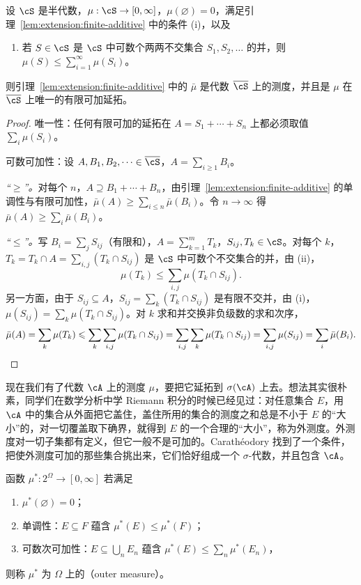 \begin{theorem}[从半代数到代数]\label{thm:extension:semialgebra}
设 $\cS$ 是半代数，$\mu:\cS\to[0,\infty]$，$\mu(\varnothing)=0$，满足引理~\ref{lem:extension:finite-additive} 中的条件 (i)，以及
\begin{enumerate}
\item[(ii)] 若 $S\in\cS$ 是 $\cS$ 中可数个两两不交集合 $S_1,S_2,\dots$ 的并，则 $\mu(S)\leqslant\sum_{i=1}^\infty\mu(S_i)$。
\end{enumerate}
则引理~\ref{lem:extension:finite-additive} 中的 $\bar\mu$ 是代数 $\overline\cS$ 上的测度，并且是 $\mu$ 在 $\overline\cS$ 上唯一的有限可加延拓。
\end{theorem}
\begin{proof}
唯一性：任何有限可加的延拓在 $A=S_1+\cdots+S_n$ 上都必须取值 $\sum_i\mu(S_i)$。

可数可加性：设 $A,B_1,B_2,\dots\in\overline\cS$，$A=\sum_{i\geqslant1}B_i$。

\emph{“$\geqslant$”。}对每个 $n$，$A\supseteq B_1+\cdots+B_n$，由引理~\ref{lem:extension:finite-additive} 的单调性与有限可加性，$\bar\mu(A)\geqslant\sum_{i\leqslant n}\bar\mu(B_i)$。令 $n\to\infty$ 得 $\bar\mu(A)\geqslant\sum_i\bar\mu(B_i)$。

\emph{“$\leqslant$”。}写 $B_i=\sum_jS_{ij}$（有限和），$A=\sum_{k=1}^mT_k$，$S_{ij},T_k\in\cS$。对每个 $k$，$T_k=T_k\cap A=\sum_{i,j}(T_k\cap S_{ij})$ 是 $\cS$ 中可数个不交集合的并，由 (ii)，
\[
\mu(T_k)\leqslant\sum_{i,j}\mu(T_k\cap S_{ij}).
\]
另一方面，由于 $S_{ij}\subseteq A$，$S_{ij}=\sum_k(T_k\cap S_{ij})$ 是有限不交并，由 (i)，$\mu(S_{ij})=\sum_k\mu(T_k\cap S_{ij})$。对 $k$ 求和并交换非负级数的求和次序，
\[
\bar\mu(A)=\sum_k\mu(T_k)\leqslant\sum_k\sum_{i,j}\mu(T_k\cap S_{ij})=\sum_{i,j}\sum_k\mu(T_k\cap S_{ij})=\sum_{i,j}\mu(S_{ij})=\sum_i\bar\mu(B_i).\qedhere
\]
\end{proof}


现在我们有了代数 $\cA$ 上的测度 $\mu$，要把它延拓到 $\sigma(\cA)$ 上去。想法其实很朴素，同学们在数学分析中学 Riemann 积分的时候已经见过：对任意集合 $E$，用 $\cA$ 中的集合从外面把它盖住，盖住所用的集合的测度之和总是不小于 $E$ 的“大小”的，对一切覆盖取下确界，就得到 $E$ 的一个合理的“大小”，称为外测度。外测度对一切子集都有定义，但它一般不是可加的。Carathéodory 找到了一个条件，把使外测度可加的那些集合挑出来，它们恰好组成一个 $\sigma$-代数，并且包含 $\cA$。

\begin{definition}[外测度]\label{def:extension:outer}
函数 $\mu^*:2^\Omega\to[0,\infty]$ 若满足
\begin{enumerate}
\item $\mu^*(\varnothing)=0$；
\item 单调性：$E\subseteq F$ 蕴含 $\mu^*(E)\leqslant\mu^*(F)$；
\item 可数次可加性：$E\subseteq\bigcup_nE_n$ 蕴含 $\mu^*(E)\leqslant\sum_n\mu^*(E_n)$，
\end{enumerate}
则称 $\mu^*$ 为 $\Omega$ 上的（outer measure）。
\end{definition}

